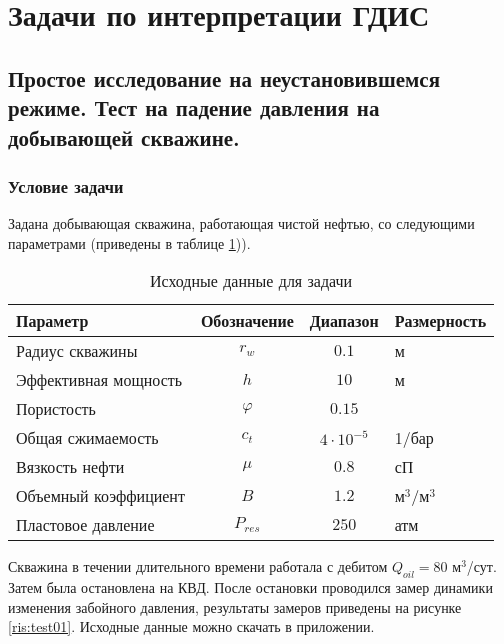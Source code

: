 \section{Задачи по интерпретации ГДИС}

\subsection{Простое исследование на неустановившемся режиме. Тест на падение давления на добывающей скважине.}

\subsubsection{Условие задачи}
Задана добывающая скважина, работающая чистой нефтью, со следующими параметрами (приведены в таблице \ref{table:test_data1})).

\begin{table}[h!]
	{
		\caption{Исходные данные для задачи}
		\label{table:test_data1}
	}
	{
		\begin{tabular}{|l|c|c|l|}
			\hline
			\rowcolor{lightgray}	Параметр& Обозначение &Диапазон &Размерность \\
			\hline
			Радиус скважины&  $r_{w} $&$ 0.1 $ &м \\
			\hline
			Эффективная мощность & $h $&$ 10$ &м  \\
			\hline
			Пористость & $\varphi $&$ 0.15 $&  \\
			\hline
			Общая сжимаемость& $c_{t} $&$ 4\cdot 10^{-5}  $ & 1/бар  \\
			\hline
			Вязкость нефти& $\mu $&$ 0.8$& сП  \\
			\hline
			Объемный коэффициент   &$B $&$ 1.2$& м$^3$/м$^3$  \\
			\hline
			Пластовое давление   &$P_{res} $&$ 250$& атм  \\
			\hline
		\end{tabular}
		
	}
\end{table}

Скважина в течении длительного времени работала с дебитом $Q_{oil} = 80$ м$^3$/сут. Затем была остановлена на КВД. После остановки проводился замер динамики изменения забойного давления, результаты замеров приведены на рисунке \ref{ris:test01}. Исходные данные можно скачать в приложении.


